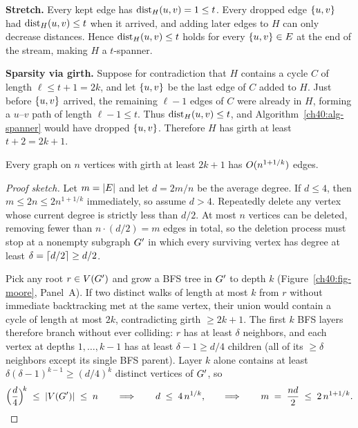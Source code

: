 \begin{whybox}
\textbf{Stretch.} Every kept edge has $\operatorname{dist}_H(u,v) = 1 \le t$. Every dropped
edge $\{u,v\}$ had $\operatorname{dist}_H(u,v) \le t$ when it arrived, and adding later
edges to $H$ can only decrease distances. Hence $\operatorname{dist}_H(u,v) \le t$ holds for
every $\{u,v\}\in E$ at the end of the stream, making $H$ a $t$-spanner.

\textbf{Sparsity via girth.} Suppose for contradiction that $H$ contains a
cycle $C$ of length $\ell \le t+1 = 2k$, and let $\{u,v\}$ be the last edge
of $C$ added to $H$. Just before $\{u,v\}$ arrived, the remaining $\ell-1$
edges of $C$ were already in $H$, forming a $u$--$v$ path of length
$\ell-1 \le t$. Thus $\operatorname{dist}_H(u,v) \le t$, and Algorithm~\ref{ch40:alg-spanner}
would have dropped $\{u,v\}$. Therefore $H$ has girth at least $t+2 = 2k+1$.
\end{whybox}

\begin{lemma}\label{ch40:lem-moore}
Every graph on $n$ vertices with girth at least $2k+1$ has $O(n^{1+1/k})$
edges.
\end{lemma}

\begin{proof}[Proof sketch]
Let $m=\lvert E\rvert$ and let $d = 2m/n$ be the average degree. If $d \le 4$, then
$m \le 2n \le 2n^{1+1/k}$ immediately, so assume $d > 4$. Repeatedly delete any
vertex whose current degree is strictly less than $d/2$. At most $n$ vertices
can be deleted, removing fewer than $n\cdot (d/2) = m$ edges in total, so the
deletion process must stop at a nonempty subgraph $G'$ in which every
surviving vertex has degree at least $\delta = \lceil d/2\rceil \ge d/2$.

Pick any root $r \in V(G')$ and grow a BFS tree in $G'$ to depth $k$
(Figure~\ref{ch40:fig-moore}, Panel~A). If two distinct walks of length at most
$k$ from $r$ without immediate backtracking met at the same vertex, their union
would contain a cycle of length at most $2k$, contradicting girth $\ge 2k+1$.
The first $k$ BFS layers therefore branch without ever colliding: $r$ has at
least $\delta$ neighbors, and each vertex at depths $1,\dots,k-1$ has at least
$\delta - 1 \ge d/4$ children (all of its $\ge \delta$ neighbors except its
single BFS parent). Layer $k$ alone contains at least $\delta(\delta-1)^{k-1}
\ge (d/4)^k$ distinct vertices of $G'$, so
\[
  \Bigl(\frac{d}{4}\Bigr)^{\!k} \;\le\; \lvert V(G')\rvert \;\le\; n
  \qquad\Longrightarrow\qquad
  d \;\le\; 4\,n^{1/k},
  \qquad\Longrightarrow\qquad
  m \;=\; \frac{nd}{2} \;\le\; 2\,n^{1+1/k}. \qedhere
\]
\end{proof}

